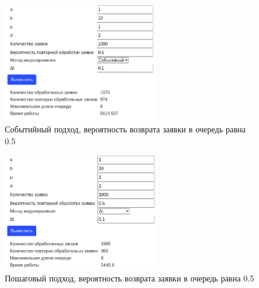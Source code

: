 \begin{figure}[H]
    \centering
    \includegraphics[width=0.6\textwidth]{images/scr05.png}
    \caption{Событийный подход, вероятность возврата заявки в очередь равна 0.5}
\end{figure}
\begin{figure}[H]
    \centering
    \includegraphics[width=0.6\textwidth]{images/scr06.png}
    \caption{Пошаговый подход, вероятность возврата заявки в очередь равна 0.5}
\end{figure}

